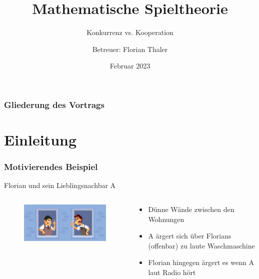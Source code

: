 \documentclass{beamer}
\title{Mathematische Spieltheorie}
\subtitle{Konkurrenz vs. Kooperation}
\author{Betreuer: Florian Thaler}
\date{Februar 2023}
\begin{document}
	\begin{frame}[plain]
		\titlepage
	\end{frame}

	\begin{frame}
		\frametitle{Gliederung des Vortrags}
		\tableofcontents
	\end{frame}

	\section{Einleitung}
		
		\begin{frame}
 			\frametitle{Motivierendes Beispiel}
            Florian und sein Lieblingsnachbar A
            \vspace{0.25cm}
 			\begin{columns}
				\begin{column}{0.25\textwidth}
					\begin{figure}[t]
						\includegraphics[scale = 0.35]{images/fightingNeighbours}	
					\end{figure}
				\end{column}
				\begin{column}{0.5\textwidth}
                    \vspace{0.5cm}
					\begin{itemize}
                        \item Dünne Wände zwischen den Wohnungen
                        \item A ärgert sich über Florians (offenbar) zu laute Waschmaschine
                        \item Florian hingegen ärgert es wenn A laut Radio hört
					\end{itemize}
				\end{column}
			\end{columns}
		\end{frame}
\end{document}
